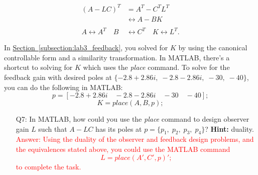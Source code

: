 \documentclass[12pt]{report}
\newcommand\drew[1]{\textcolor{red}{#1}}
\begin{document}
\begin{align*}
    (A-LC)^T                      & = A^T - C^T L^T                                  \\
                                  & \leftrightarrow A - BK                           \\
    \\
    A \leftrightarrow A^T \quad B & \leftrightarrow C^T \quad K \leftrightarrow L^T.
\end{align*}

In \hyperref[subsection:lab3_feedback]{Section~\ref{subsection:lab3_feedback}}, you solved for $K$ by using the canonical controllable form and a similarity transformation. In MATLAB, there's a shortcut to solving for $K$ which uses the \emph{place} command. To solve for the feedback gain with desired poles at $\{-2.8 + 2.86i, \; -2.8 - 2.86i, \; -30, \; -40\}$, you can do the following in MATLAB:
\[
    p = [-2.8 + 2.86i \quad -2.8 - 2.86i \quad -30 \quad -40];
\]
\[
    K = place(A,B,p);
\]
\begin{enumerate}[Question]
    \item[Q7:] In MATLAB, how could you use the \emph{place} command to design observer gain $L$ such that $A-LC$ has its poles at $p =\{p_1, \; p_2, \; p_3, \; p_4\}$? \textbf{Hint:} duality.\\
          \drew{Answer: Using the duality of the observer and feedback design problems, and the equivalences stated above, you could use the MATLAB command
              \[
                  L = place(A',C',p)';
              \]
              to complete the task.}
\end{enumerate}
\end{document}

